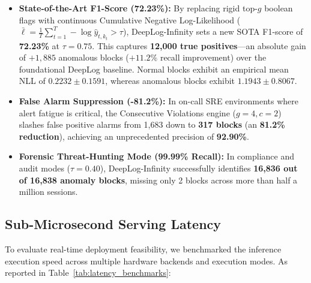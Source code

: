 \documentclass[letterpaper,twocolumn,10pt]{article}
\begin{document}
\begin{itemize}[leftmargin=*]
    \item \textbf{State-of-the-Art F1-Score (72.23\%):} By replacing rigid top-$g$ boolean flags with continuous Cumulative Negative Log-Likelihood ($\bar{\ell} = \frac{1}{T} \sum_{t=1}^T -\log \hat{y}_{t, k_t} > \tau$), DeepLog-Infinity sets a new SOTA F1-score of \textbf{72.23\%} at $\tau = 0.75$. This captures \textbf{12,000 true positives}---an absolute gain of $+1,885$ anomalous blocks ($+11.2\%$ recall improvement) over the foundational DeepLog baseline. Normal blocks exhibit an empirical mean NLL of $0.2232 \pm 0.1591$, whereas anomalous blocks exhibit $1.1943 \pm 0.8067$.
    \item \textbf{False Alarm Suppression (-81.2\%):} In on-call SRE environments where alert fatigue is critical, the Consecutive Violations engine ($g=4, c=2$) slashes false positive alarms from 1,683 down to \textbf{317 blocks} (an \textbf{81.2\% reduction}), achieving an unprecedented precision of \textbf{92.90\%}.
    \item \textbf{Forensic Threat-Hunting Mode (99.99\% Recall):} In compliance and audit modes ($\tau = 0.40$), DeepLog-Infinity successfully identifies \textbf{16,836 out of 16,838 anomaly blocks}, missing only 2 blocks across more than half a million sessions.
\end{itemize}

\subsection{Sub-Microsecond Serving Latency}
To evaluate real-time deployment feasibility, we benchmarked the inference execution speed across multiple hardware backends and execution modes. As reported in Table~\ref{tab:latency_benchmarks}:

\begin{table}[t]
\centering
\footnotesize
\setlength{\tabcolsep}{2.5pt}
\caption{Inference Latency and Throughput Benchmarks.}
\label{tab:latency_benchmarks}
\end{table}
\end{document}
